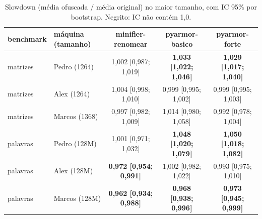 \begin{table}[ht]\centering\footnotesize
\caption{Slowdown (média ofuscada / média original) no maior tamanho, com IC 95\% por bootstrap. Negrito: IC não contém 1,0.}\label{tab:resumo}
\begin{tabular}{llccc}\hline
benchmark & máquina (tamanho) & minifier-renomear & pyarmor-basico & pyarmor-forte \\\hline
matrizes & Pedro (1264) & 1,002 [0,987; 1,019] & \textbf{1,033 [1,022; 1,046]} & \textbf{1,029 [1,017; 1,040]} \\
matrizes & Alex (1264) & 1,004 [0,998; 1,010] & 0,999 [0,995; 1,002] & 0,999 [0,995; 1,003] \\
matrizes & Marcos (1368) & 0,997 [0,982; 1,009] & 1,014 [0,980; 1,058] & 0,992 [0,978; 1,004] \\
palavras & Pedro (128M) & 1,001 [0,971; 1,032] & \textbf{1,048 [1,020; 1,079]} & \textbf{1,050 [1,018; 1,082]} \\
palavras & Alex (128M) & \textbf{0,972 [0,954; 0,991]} & 1,002 [0,982; 1,022] & 0,993 [0,975; 1,010] \\
palavras & Marcos (128M) & \textbf{0,962 [0,934; 0,988]} & \textbf{0,968 [0,938; 0,996]} & \textbf{0,973 [0,945; 0,999]} \\
\hline\end{tabular}\end{table}
